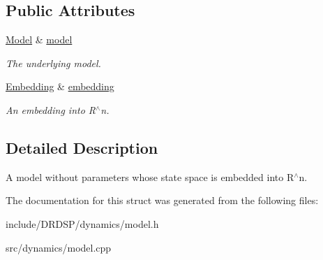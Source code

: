 \subsection*{Public Attributes}
\begin{DoxyCompactItemize}
\item 
\hypertarget{struct_d_r_d_s_p_1_1_model_embedded_a2d021cf215cdd084fde36bbd46101cc5}{\hyperlink{struct_d_r_d_s_p_1_1_model}{Model} \& \hyperlink{struct_d_r_d_s_p_1_1_model_embedded_a2d021cf215cdd084fde36bbd46101cc5}{model}}\label{struct_d_r_d_s_p_1_1_model_embedded_a2d021cf215cdd084fde36bbd46101cc5}

\begin{DoxyCompactList}\small\item\em The underlying model. \end{DoxyCompactList}\item 
\hypertarget{struct_d_r_d_s_p_1_1_model_embedded_a22aeda6bb7f303b3e79a6f133887439b}{\hyperlink{struct_d_r_d_s_p_1_1_embedding}{Embedding} \& \hyperlink{struct_d_r_d_s_p_1_1_model_embedded_a22aeda6bb7f303b3e79a6f133887439b}{embedding}}\label{struct_d_r_d_s_p_1_1_model_embedded_a22aeda6bb7f303b3e79a6f133887439b}

\begin{DoxyCompactList}\small\item\em An embedding into R$^\wedge$n. \end{DoxyCompactList}\end{DoxyCompactItemize}


\subsection{Detailed Description}
A model without parameters whose state space is embedded into R$^\wedge$n. 

The documentation for this struct was generated from the following files\-:\begin{DoxyCompactItemize}
\item 
include/\-D\-R\-D\-S\-P/dynamics/model.\-h\item 
src/dynamics/model.\-cpp\end{DoxyCompactItemize}
